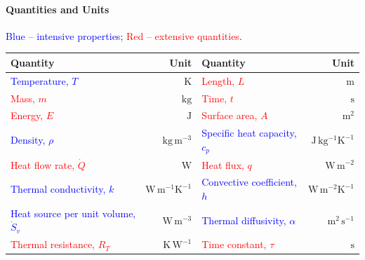 \documentclass[10pt, a4paper, table]{article}
\begin{document}
\small

\begin{mdframed}\vspace{-.5cm}
\paragraph{Quantities and Units} 
\textcolor{blue}{Blue -- intensive properties}; \textcolor{red}{Red -- extensive quantities}.
\begin{table}[H] \vspace{-.2cm} %
\centering
\begin{tabular}{lrlr}
\toprule
\textbf{Quantity} & \textbf{Unit} & \textbf{Quantity} & \textbf{Unit} \\ 
\midrule

\textcolor{blue}{Temperature, $T$} & $\mathrm{K}$ 
& \textcolor{red}{Length, $L$} & $\mathrm{m}$ \\ 

\textcolor{red}{Mass, $m$} & $\mathrm{kg}$ 
& \textcolor{red}{Time, $t$} & $\mathrm{s}$ \\

\textcolor{red}{Energy, $E$} & $\mathrm{J}$ 
& \textcolor{red}{Surface area, $A$} & $\mathrm{m^{2}}$ \\ 

\textcolor{blue}{Density, $\rho$} & $\mathrm{kg\,m^{-3}}$ 
& \textcolor{blue}{Specific heat capacity, $c_{p}$} & $\mathrm{J\,kg^{-1}K^{-1}}$ \\ 

\textcolor{red}{Heat flow rate, $\dot{Q}$} & $\mathrm{W}$ 
& \textcolor{red}{Heat flux, $q$} & $\mathrm{W\,m^{-2}}$ \\

\textcolor{blue}{Thermal conductivity, $k$} & $\mathrm{W\,m^{-1}K^{-1}}$ 
& \textcolor{blue}{Convective coefficient, $h$} & $\mathrm{W\,m^{-2}K^{-1}}$ \\

\textcolor{blue}{Heat source per unit volume, $\dot{S}_{v}$} & $\mathrm{W\,m^{-3}}$ 
& \textcolor{blue}{Thermal diffusivity, $\alpha$} & $\mathrm{m^{2}\,s^{-1}}$ \\ 

\textcolor{red}{Thermal resistance, $R_{T}$} & $\mathrm{K\,W^{-1}}$ 
& \textcolor{red}{Time constant, $\tau$} & $\mathrm{s}$ \\


\end{tabular}
\end{table}
\end{mdframed}
\end{document}
